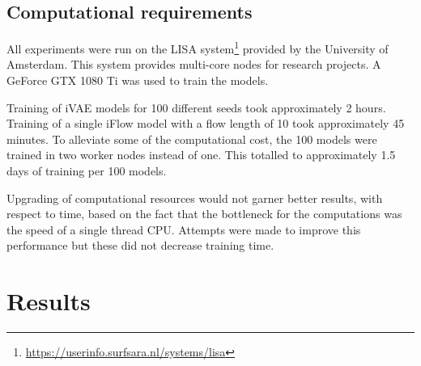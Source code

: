 \subsection{Computational requirements}
\label{sec:requirements}
All experiments were run on the LISA system\footnote{\url{https://userinfo.surfsara.nl/systems/lisa}} provided by the University of Amsterdam. This system provides multi-core nodes for research projects. A GeForce GTX 1080 Ti was used to train the models.

Training of iVAE models for 100 different seeds took approximately 2 hours. Training of a single iFlow model with a flow length of 10 took approximately 45 minutes. To alleviate some of the computational cost, the 100 models were trained in two worker nodes instead of one. This totalled to approximately 1.5 days of training per 100 models.

Upgrading of computational resources would not garner better results, with respect to time, based on the fact that the bottleneck for the computations was the speed of a single thread CPU. Attempts were made to improve this performance but these did not decrease training time.

\section{Results}
\label{sec:results}

